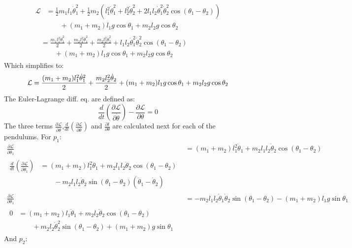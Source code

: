 \begin{align}
	\begin{split}
		\mathcal{L}&=\frac{1}{2}m_1l_1\dot\theta_1^2+\frac{1}{2}m_2\left(l_1^2\dot\theta_1^2+l_2^2\dot\theta_2^2+2l_1l_2\dot\theta_1^2\dot\theta_2^2\cos{(\theta_1-\theta_2)}\right)\\
		&\qquad+(m_1+m_2)l_1g\cos{\theta_1}+m_2l_2g\cos{\theta_2}
	\end{split}\\
	\begin{split}
		&=\frac{m_1l_1^2\dot\theta_1^2}{2}+\frac{m_2l_1^2\dot\theta_1^2}{2}+\frac{m_2l_2^2\dot\theta_2^2}{2}+l_1l_2\dot\theta_1^2\dot\theta_2^2\cos{(\theta_1-\theta_2)}\\
		&\qquad+(m_1+m_2)l_1g\cos{\theta_1}+m_2l_2g\cos{\theta_2}
	\end{split}
\end{align}
Which simplifies to:
\begin{equation}
	\label{eq:lagrangian}
	\mathcal{L}=\frac{(m_1+m_2)l_1^2\dot\theta_1^2}{2}+\frac{m_2l_2^2\dot\theta_2}{2}+(m_1+m_2)l_1g\cos{\theta_1}+m_2l_2g\cos{\theta_2}\\
\end{equation}
The Euler-Lagrange diff. eq. are defined as:
\begin{equation}
	\frac{d}{dt}\left(\frac{\partial \mathcal{L}}{\partial \dot\theta}\right)-\frac{\partial \mathcal{L}}{\partial \theta} = 0
\end{equation}
The three terms $\frac{\partial \mathcal{L}}{\partial \dot\theta}$,$\frac{d}{dt}\left(\frac{\partial \mathcal{L}}{\partial \dot\theta}\right)$ and $\frac{\partial l}{\partial \theta}$ are calculated next for each of the pendulums. For $p_1$:
\begin{align}
	\frac{\partial \mathcal{L}}{\partial \dot\theta_1}&=(m_1+m_2)l_1^2\dot\theta_1+m_2l_1l_2\dot\theta_2\cos{(\theta_1-\theta_2)}\\
	\begin{split}
		\frac{d}{dt}\left(\frac{\partial \mathcal{L}}{\partial \dot\theta_1}\right)&=(m_1+m_2)l_1^2\ddot\theta_1+m_2l_1l_2\ddot\theta_2\cos{(\theta_1-\theta_2)}\\
		&\qquad-m_2l_1l_2\dot\theta_2\sin{(\theta_1-\theta_2)(\dot\theta_1-\dot\theta_2)}
	\end{split}\\
	\frac{\partial \mathcal{L}}{\partial \theta_1} &= -m_2l_1l_2\dot\theta_1\dot\theta_2\sin(\theta_1-\theta_2)-(m_1+m_2)l_1g\sin{\theta_1}\\
	\begin{split}
		0&=(m_1+m_2)l_1\ddot\theta_1+m_2l_2\ddot\theta_2\cos{(\theta_1-\theta_2)}\\
		&\qquad+m_2l_2\dot\theta_2^2\sin{(\theta_1-\theta_2)}+(m_1+m_2)g\sin{\theta_1}
	\end{split}
\end{align}
And $p_2$:

